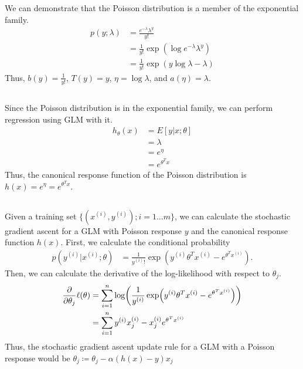 \documentclass[11pt,a4paper,titlepage]{article}
\begin{document}
\section{}{
\subsection{}{
\quad We can demonstrate that the Poisson distribution is a member of the exponential family.
\begin{align*}
	p(y;\lambda) &= \frac{e^{-\lambda}\lambda^y}{y!}
    \\&=\frac{1}{y!} \exp(\log e^{-\lambda}\lambda^y)
    \\&=\frac{1}{y!} \exp(y\log\lambda - \lambda)
\end{align*}
Thus, $b(y)=\frac{1}{y!}$, $T(y)=y$, $\eta=\log\lambda$, and $a(\eta)=\lambda$.
}\label{prob:2a}
\subsection{}{
\quad Since the Poisson distribution is in the exponential family, we can perform regression using GLM with it.
\begin{align*}
	h_\theta(x)&=E[y|x;\theta]
    \\&= \lambda
    \\&= e^\eta
    \\&= e^{\theta^Tx}
\end{align*}
Thus, the canonical response function of the Poisson distribution is $h(x) = e^\eta = e^{\theta^Tx}$.
}\label{prob:2b}
\subsection{}{
\quad Given a training set $\{(x^{(i)}, y^{(i)});i=1\ldots m\}$, we can calculate the stochastic gradient ascent for a GLM with Poisson response $y$ and the canonical response function $h(x)$. 
\quad First, we calculate the conditional probability
\begin{align*}
	p(y^{(i)}|x^{(i)};\theta) &= \frac{1}{y^{(i)}!} \exp(y^{(i)}\theta^Tx^{(i)}-e^{\theta^Tx^{(i)}}).
\end{align*}
Then, we can calculate the derivative of the log-likelihood with respect to $\theta_j$.
\begin{align*}
	\pdv{}{\theta_j} \ell(\theta) &= \sum_{i=1}^{n} \log(\frac{1}{y^{(i)}} \exp(y^{(i)}\theta^Tx^{(i)} - e^{\theta^Tx^{(i)}}))
    \\&= \sum_{i=1}^n y^{(i)}x^{(i)}_j - x^{(i)}_je^{\theta^Tx^{(i)}}
\end{align*}
Thus, the stochastic gradient ascent update rule for a GLM with a Poisson response would be $\theta_j \coloneqq \theta_j - \alpha(h(x)-y)x_j$
}\label{prob:2c}
}
\end{document}
